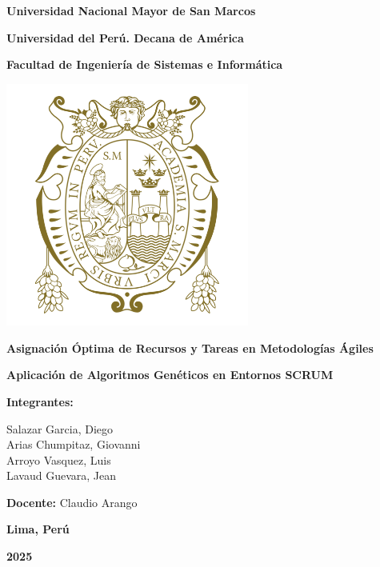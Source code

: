 \begingroup
\setlength{\parskip}{0pt}

\begin{titlepage}
    \centering
    {\LARGE\bfseries Universidad Nacional Mayor de San Marcos \par}
    {\large\bfseries Universidad del Perú. Decana de América\par}
    \vspace{0.5cm}
    {\Large\bfseries Facultad de Ingeniería de Sistemas e Informática\par}
    \vspace{0.5cm}

    \includegraphics[width=8cm]{imagenes/logo-unmsm.png}\par
    \vspace{0.5cm}

    {\LARGE\bfseries Asignación Óptima de Recursos y Tareas en Metodologías Ágiles\par}
    \vspace{0.5cm}
    {\large\bfseries Aplicación de Algoritmos Genéticos en Entornos SCRUM\par}
    \vspace{1cm}

    {\Large\bfseries Integrantes:\par}
    \vspace{0.5cm}
    Salazar Garcia, Diego\\[4pt]
    Arias Chumpitaz, Giovanni\\[4pt]
    Arroyo Vasquez, Luis\\[4pt]
    Lavaud Guevara, Jean\\[4pt]
    \vspace{1cm}

    {\large \textbf{Docente:} Claudio Arango\par}
    \vfill

    {\large\bfseries Lima, Perú\par}
    {\large\bfseries 2025\par}
\end{titlepage}

\endgroup
